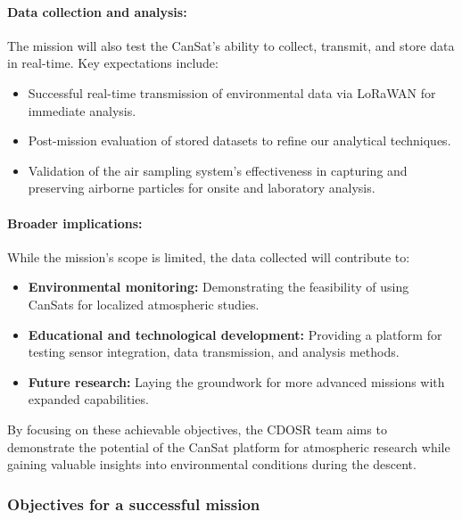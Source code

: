 \paragraph*{Data collection and analysis:}
The mission will also test the CanSat’s ability to collect, transmit, and store data in real-time. Key expectations include:
\begin{itemize}[leftmargin=1.27cm, itemindent=0cm, topsep=2pt]
    \item Successful real-time transmission of environmental data via LoRaWAN for immediate analysis.
    \item Post-mission evaluation of stored datasets to refine our analytical techniques.
    \item Validation of the air sampling system’s effectiveness in capturing and preserving airborne particles for onsite and laboratory analysis.
\end{itemize}

\paragraph{Broader implications:}
While the mission’s scope is limited, the data collected will contribute to:
\begin{itemize}[leftmargin=1.27cm, itemindent=0cm, topsep=2pt]
    \item \textbf{Environmental monitoring:} Demonstrating the feasibility of using CanSats for localized atmospheric studies.
    \item \textbf{Educational and technological development:} Providing a platform for testing sensor integration, data transmission, and analysis methods.
    \item \textbf{Future research:} Laying the groundwork for more advanced missions with expanded capabilities.
\end{itemize}

By focusing on these achievable objectives, the CDOSR team aims to demonstrate the potential of the CanSat platform for atmospheric research while gaining valuable insights into environmental conditions during the descent.

\subsubsection{Objectives for a successful mission}

